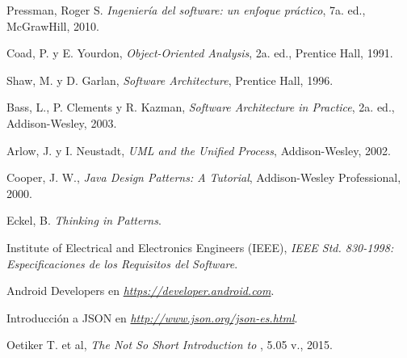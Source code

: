 \begin{thebibliography}{} %
	
	Pressman, Roger S.
	\emph{Ingeniería del software: un enfoque práctico},
	7a. ed.,
	McGrawHill,
	2010.
	
	Coad, P. y E. Yourdon, 
	\emph{Object-Oriented Analysis}, 
	2a. ed., 
	Prentice Hall, 
	1991.
	
	Shaw, M. y D. Garlan, 
	\emph{Software Architecture}, 
	Prentice Hall, 
	1996.
	
	Bass, L., P. Clements y R. Kazman, 
	\emph{Software Architecture in Practice}, 
	2a. ed., 
	Addison-Wesley, 
	2003.
	
	Arlow, J. y I. Neustadt, 
	\emph{UML and the Unified Process}, 
	Addison-Wesley, 
	2002.
	
	Cooper, J. W.,
	\emph{Java Design Patterns: A Tutorial}, 
	Addison-Wesley Professional, 
	2000.
	
	Eckel, B.
	\emph{Thinking in Patterns}.
	
	Institute of Electrical and Electronics Engineers (IEEE),
	\emph{IEEE Std. 830-1998: Especificaciones de los Requisitos del Software}.
	
	Android Developers en
	\emph{\url{https://developer.android.com}}.
	
	Introducción a JSON en
	\emph{\url{http://www.json.org/json-es.html}}.
	
	Oetiker T. et al,
	\emph{The Not So Short Introduction to \LaTeXe},
	5.05 v.,
	2015.
		
\end{thebibliography}